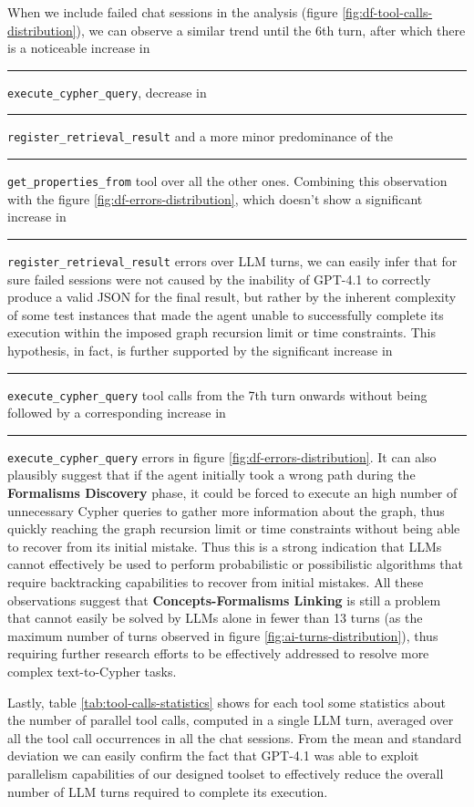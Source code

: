 When we include failed chat sessions in the analysis (figure \ref{fig:df-tool-calls-distribution}), we can observe a similar trend until the 6th turn, after which there is a noticeable increase in \textcolor{execute\_cypher\_query}{\rule{8pt}{4pt}}\texttt{execute\_cypher\_query}, decrease in  \textcolor{register\_retrieval\_result}{\rule{8pt}{4pt}}\texttt{register\_retrieval\_result} and a more minor predominance of the \textcolor{get\_properties\_from}{\rule{8pt}{4pt}}\texttt{get\_properties\_from} tool over all the other ones. Combining this observation with the figure \ref{fig:df-errors-distribution}, which doesn't show a significant increase in \textcolor{register\_retrieval\_result}{\rule{8pt}{4pt}}\texttt{register\_retrieval\_result} errors over LLM turns, we can easily infer that for sure failed sessions were not caused by the inability of GPT-4.1 to correctly produce a valid JSON for the final result, but rather by the inherent complexity of some test instances that made the agent unable to successfully complete its execution within the imposed graph recursion limit or time constraints. This hypothesis, in fact, is further supported by the significant increase in \textcolor{execute\_cypher\_query}{\rule{8pt}{4pt}}\texttt{execute\_cypher\_query} tool calls from the 7th turn onwards without being followed by a corresponding increase in \textcolor{execute\_cypher\_query}{\rule{8pt}{4pt}}\texttt{execute\_cypher\_query} errors in figure \ref{fig:df-errors-distribution}. It can also plausibly suggest that if the agent initially took a wrong path during the \textbf{Formalisms Discovery} phase, it could be forced to execute an high number of unnecessary Cypher queries to gather more information about the graph, thus quickly reaching the graph recursion limit or time constraints without being able to recover from its initial mistake. Thus this is a strong indication that LLMs cannot effectively be used to perform probabilistic or possibilistic algorithms that require backtracking capabilities to recover from initial mistakes. All these observations suggest that \textbf{Concepts-Formalisms Linking} is still a problem that cannot easily be solved by LLMs alone in fewer than 13 turns (as the maximum number of turns observed in figure \ref{fig:ai-turns-distribution}), thus requiring further research efforts to be effectively addressed to resolve more complex text-to-Cypher tasks.

Lastly, table \ref{tab:tool-calls-statistics} shows for each tool some statistics about the number of parallel tool calls, computed in a single LLM turn, averaged over all the tool call occurrences in all the chat sessions. From the mean and standard deviation we can easily confirm the fact that GPT-4.1 was able to exploit parallelism capabilities of our designed toolset to effectively reduce the overall number of LLM turns required to complete its execution. %

